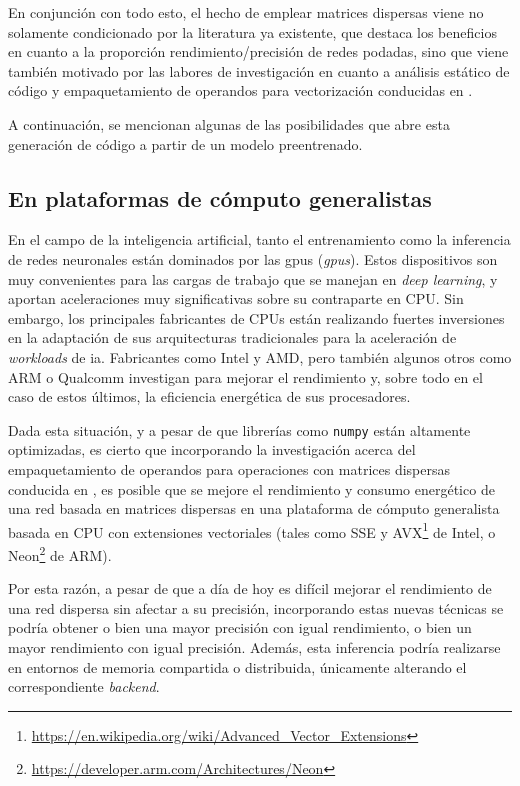En conjunción con todo esto, el hecho de emplear matrices dispersas viene no solamente condicionado por la literatura ya existente, que destaca los beneficios en cuanto a la proporción rendimiento/precisión de redes podadas, sino que viene también motivado por las labores de investigación en cuanto a análisis estático de código y empaquetamiento de operandos para vectorización conducidas en \cite{custom_high_performance_vector_codegen_sparse_computations}.

A continuación, se mencionan algunas de las posibilidades que abre esta generación de código a partir de un modelo preentrenado.

\subsection{En plataformas de cómputo generalistas}
\label{ssec:posibilidades_en_computo_generalistas}
En el campo de la inteligencia artificial, tanto el entrenamiento como la inferencia de redes neuronales están dominados por las \acrshort{gpu}s (\textit{\acrlong{gpu}s}). Estos dispositivos son muy convenientes para las cargas de trabajo que se manejan en \textit{deep learning}, y aportan aceleraciones muy significativas sobre su contraparte en CPU. Sin embargo, los principales fabricantes de CPUs están realizando fuertes inversiones en la adaptación de sus arquitecturas tradicionales para la aceleración de \textit{workloads} de \acrshort{ia}. Fabricantes como Intel y AMD, pero también algunos otros como ARM o Qualcomm investigan para mejorar el rendimiento y, sobre todo en el caso de estos últimos, la eficiencia energética de sus procesadores.

Dada esta situación, y a pesar de que librerías como \texttt{numpy} están altamente optimizadas, es cierto que incorporando la investigación acerca del empaquetamiento de operandos para operaciones con matrices dispersas conducida en \cite{custom_high_performance_vector_codegen_sparse_computations}, es posible que se mejore el rendimiento y consumo energético de una red basada en matrices dispersas en una plataforma de cómputo generalista basada en CPU con extensiones vectoriales (tales como SSE y AVX\footnote{\url{https://en.wikipedia.org/wiki/Advanced\_Vector\_Extensions}} de Intel, o Neon\footnote{\url{https://developer.arm.com/Architectures/Neon}} de ARM).

Por esta razón, a pesar de que a día de hoy es difícil mejorar el rendimiento de una red dispersa sin afectar a su precisión, incorporando estas nuevas técnicas se podría obtener o bien una mayor precisión con igual rendimiento, o bien un mayor rendimiento con igual precisión. Además, esta inferencia podría realizarse en entornos de memoria compartida o distribuida, únicamente alterando el correspondiente \textit{\gls{backend}}.


